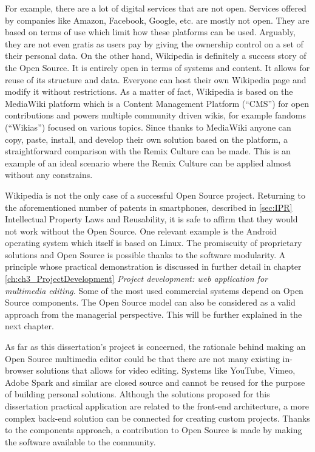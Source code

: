 For example, there are a lot of digital services that are not open. Services offered by companies like Amazon, Facebook, Google, etc. are mostly not open. They are based on terms of use which limit how these platforms can be used. Arguably, they are not even gratis as users pay by giving the ownership control on a set of their personal data.
On the other hand, Wikipedia is definitely a success story of the Open Source. It is entirely open in terms of systems and content. It allows for reuse of its structure and data. Everyone can host their own Wikipedia page and modify it without restrictions. As a matter of fact, Wikipedia is based on the MediaWiki platform which is a Content Management Platform (“CMS”) for open contributions and powers multiple community driven wikis, for example fandoms (“Wikias”) focused on various topics. Since thanks to MediaWiki anyone can copy, paste, install, and develop their own solution based on the platform, a straightforward comparison with the Remix Culture can be made. This is an example of an ideal scenario where the Remix Culture can be applied almost without any constrains.

Wikipedia is not the only case of a successful Open Source project. Returning to the aforementioned number of patents in smartphones, described in \ref{sec:IPR} Intellectual Property Laws and Reusability, it is safe to affirm that they would not work without the Open Source. One relevant example is the Android operating system which itself is based on Linux. The promiscuity of proprietary solutions and Open Source is possible thanks to the software modularity. A principle whose practical demonstration is discussed in further detail in chapter \ref{ch:ch3_ProjectDevelopment} \emph{Project development: web application for multimedia editing}. Some of the most used commercial systems depend on Open Source components. The Open Source model can also be considered as a valid approach from the managerial perspective. This will be further explained in the next chapter.

As far as this dissertation’s project is concerned, the rationale behind making an Open Source multimedia editor could be that there are not many existing in-browser solutions that allows for video editing. Systems like YouTube, Vimeo, Adobe Spark and similar are closed source and cannot be reused for the purpose of building personal solutions. Although the solutions proposed for this dissertation practical application are related to the front-end architecture, a more complex back-end solution can be connected for creating custom projects. Thanks to the components approach, a contribution to Open Source is made by making the software available to the community.


